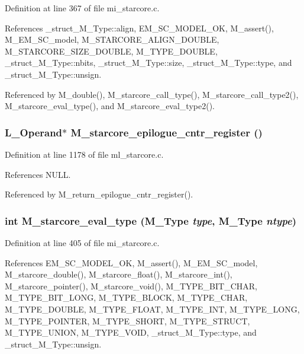 Definition at line 367 of file mi\_\-starcore.c.

References \_\-struct\_\-M\_\-Type::align, EM\_\-SC\_\-MODEL\_\-OK, M\_\-assert(), M\_\-EM\_\-SC\_\-model, M\_\-STARCORE\_\-ALIGN\_\-DOUBLE, M\_\-STARCORE\_\-SIZE\_\-DOUBLE, M\_\-TYPE\_\-DOUBLE, \_\-struct\_\-M\_\-Type::nbits, \_\-struct\_\-M\_\-Type::size, \_\-struct\_\-M\_\-Type::type, and \_\-struct\_\-M\_\-Type::unsign.

Referenced by M\_\-double(), M\_\-starcore\_\-call\_\-type(), M\_\-starcore\_\-call\_\-type2(), M\_\-starcore\_\-eval\_\-type(), and M\_\-starcore\_\-eval\_\-type2().
\subsubsection{\setlength{\rightskip}{0pt plus 5cm}L\_\-Operand$\ast$ M\_\-starcore\_\-epilogue\_\-cntr\_\-register ()}\label{m__starcore_8h_922691e8e0050b73de9f008389477b18}




Definition at line 1178 of file ml\_\-starcore.c.

References NULL.

Referenced by M\_\-return\_\-epilogue\_\-cntr\_\-register().
\subsubsection{\setlength{\rightskip}{0pt plus 5cm}int M\_\-starcore\_\-eval\_\-type (\bf{M\_\-Type} {\em type}, \bf{M\_\-Type} {\em ntype})}\label{m__starcore_8h_50e4c30b63b5b719d6170a200fb8e5fc}




Definition at line 405 of file mi\_\-starcore.c.

References EM\_\-SC\_\-MODEL\_\-OK, M\_\-assert(), M\_\-EM\_\-SC\_\-model, M\_\-starcore\_\-double(), M\_\-starcore\_\-float(), M\_\-starcore\_\-int(), M\_\-starcore\_\-pointer(), M\_\-starcore\_\-void(), M\_\-TYPE\_\-BIT\_\-CHAR, M\_\-TYPE\_\-BIT\_\-LONG, M\_\-TYPE\_\-BLOCK, M\_\-TYPE\_\-CHAR, M\_\-TYPE\_\-DOUBLE, M\_\-TYPE\_\-FLOAT, M\_\-TYPE\_\-INT, M\_\-TYPE\_\-LONG, M\_\-TYPE\_\-POINTER, M\_\-TYPE\_\-SHORT, M\_\-TYPE\_\-STRUCT, M\_\-TYPE\_\-UNION, M\_\-TYPE\_\-VOID, \_\-struct\_\-M\_\-Type::type, and \_\-struct\_\-M\_\-Type::unsign.

